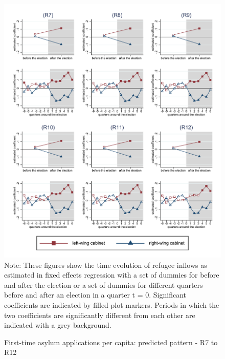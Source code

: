 \documentclass[11pt,a4paper]{scrartcl}
\begin{document}
\clearpage
\FloatBarrier


\clearpage
\FloatBarrier
\begin{figure}[!ht]
	\caption{First-time asylum applications per capita: predicted pattern - R7 to R12}
	\includegraphics[width=1\textwidth]{../results/applications/app_graphs_R7-R12.pdf}
	\scriptsize{Note: These figures show the time evolution of refugee inflows as estimated in fixed effects regression
		with a set of dummies for before and after the election or a set of dummies for different quarters before and after an election in a quarter t = 0. Significant coefficients are indicated by filled plot markers. Periods in which the two coefficients are significantly different from each other are indicated with a grey background.}
\end{figure}

%
%
%
%
%
%
%
\end{document}
